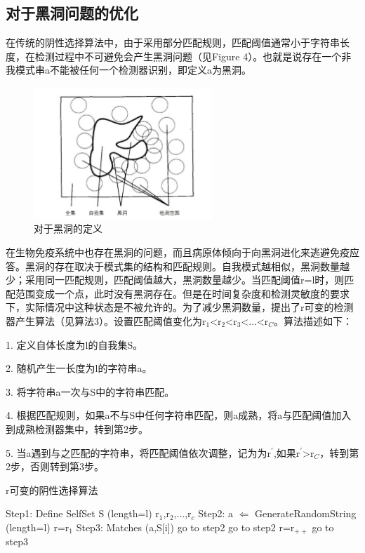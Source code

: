 \documentclass[preprint,12pt,3p]{elsarticle}
\begin{document}
\subsection{对于黑洞问题的优化}
\label{subsec3}
在传统的阴性选择算法中，由于采用部分匹配规则，匹配阈值通常小于字符串长度，在检测过程中不可避免会产生黑洞问题（见Figure 4）。也就是说存在一个非我模式串a不能被任何一个检测器识别，即定义a为黑洞。
\begin{figure}[hb]
  \centering
  \includegraphics[width=0.6\textwidth]{img/blackhole.jpg}
  \caption{对于黑洞的定义} 
\end{figure}

\par
在生物免疫系统中也存在黑洞的问题，而且病原体倾向于向黑洞进化来逃避免疫应答。黑洞的存在取决于模式集的结构和匹配规则。自我模式越相似，黑洞数量越少；采用同一匹配规则，匹配阈值越大，黑洞数量越少。当匹配阈值r=l时，则匹配范围变成一个点，此时没有黑洞存在。但是在时间复杂度和检测灵敏度的要求下，实际情况中这种状态是不被允许的。为了减少黑洞数量，提出了r可变的检测器产生算法（见算法3）。设置匹配阈值变化为r$_{1}$<r$_{2}$<r$_{3}$<...<r$_{C}$。算法描述如下：
\par
1. 定义自体长度为l的自我集S。
\par
2. 随机产生一长度为l的字符串a。
\par
3. 将字符串a一次与S中的字符串匹配。
\par
4. 根据匹配规则，如果a不与S中任何字符串匹配，则a成熟，将a与匹配阈值加入到成熟检测器集中，转到第2步。
\par
5. 当a遇到与之匹配的字符串，将匹配阈值依次调整，记为为r$^{'}$,如果r$^{'}$>r$_{C}$，转到第2步，否则转到第3步。

\begin{algorithm}[H]
   \caption{r可变的阴性选择算法}          
   \begin{algorithmic}  
       \STATE Step1: Define SelfSet S (length=l) r$_1$,r$_2$,...,r$_c$
       \STATE Step2: a $\Leftarrow$ GenerateRandomString (length=l) r=r$_1$
       \STATE Step3: Matches (a,S[i])
       \STATE go to step2
       \STATE go to step2
       \ELSE
       \STATE r=r$_{++}$ 
       \STATE go to step3
       \ENDIF 
   \end{algorithmic}
\end{algorithm} 
\end{document}
